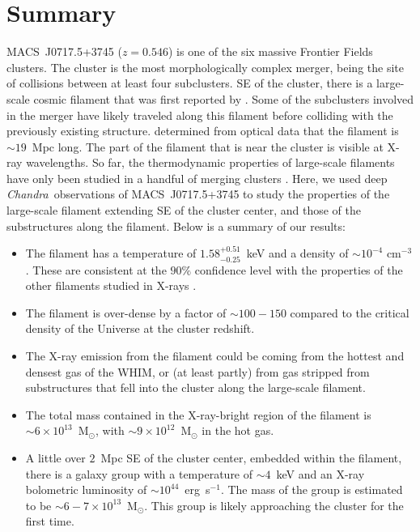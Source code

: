 \documentclass[11pt,a4paper,useAMS,iop]{emulateapj}
\newcommand{\chandra}{\emph{Chandra}}
\begin{document}
\section{Summary}
\label{sec:Summary}

MACS~J0717.5+3745 ($z=0.546$) is one of the six massive Frontier Fields clusters. The cluster is the most morphologically complex merger, being the site of collisions between at least four subclusters. SE of the cluster, there is a large-scale cosmic filament that was first reported by \citet{Ebeling2004}. Some of the subclusters involved in the merger have likely traveled along this filament before colliding with the previously existing structure. \citet{Jauzac2012} determined from optical data that the filament is $\sim 19$~Mpc long. The part of the filament that is near the cluster is visible at X-ray wavelengths. So far, the thermodynamic properties of large-scale filaments have only been studied in a handful of merging clusters \citep{Werner2008, Eckert2015, Bulbul2016}. Here, we used deep \chandra\ observations of MACS~J0717.5+3745 to study the properties of the large-scale filament extending SE of the cluster center, and those of the substructures along the filament. Below is a summary of our results:

\begin{itemize}
	\item The filament has a temperature of $1.58_{-0.25}^{+0.51}$~keV and a density of $\sim 10^{-4}$ cm$^{-3}$. These are consistent at the $90\%$ confidence level with the properties of the other filaments studied in X-rays \citep{Werner2008, Eckert2015, Bulbul2016}.
	\item The filament is over-dense by a factor of $\sim 100-150$ compared to the critical density of the Universe at the cluster redshift.
	\item The X-ray emission from the filament could be coming from the hottest and densest gas of the WHIM, or (at least partly) from gas stripped from substructures that fell into the cluster along the large-scale filament.
	\item The total mass contained in the X-ray-bright region of the filament is $\sim 6\times 10^{13}$~M$_\odot$, with $\sim 9\times 10^{12}$~M$_\odot$ in the hot gas.
	\item A little over $2$~Mpc SE of the cluster center, embedded within the filament, there is a galaxy group with a temperature of $\sim 4$~keV and an X-ray bolometric luminosity of $\sim 10^{44}$~erg~s$^{-1}$. The mass of the group is estimated to be $\sim 6-7\times 10^{13}$~M$_\odot$. This group is likely approaching the cluster for the first time.
\end{itemize}
\end{document}
